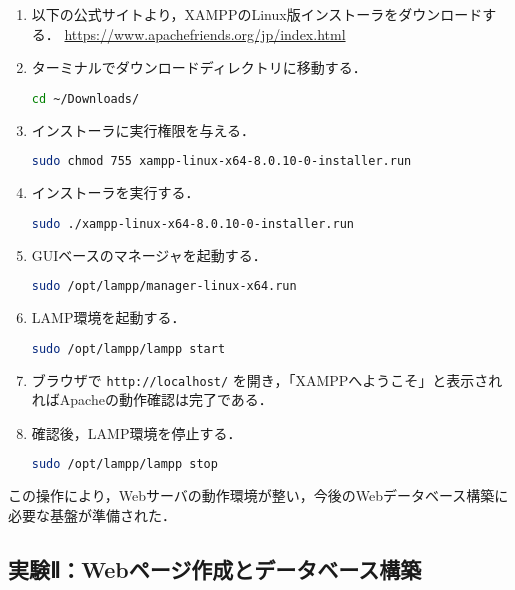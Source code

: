 \begin{enumerate}
  \item 以下の公式サイトより，XAMPPのLinux版インストーラをダウンロードする．  
        \url{https://www.apachefriends.org/jp/index.html}

  \item ターミナルでダウンロードディレクトリに移動する．
\begin{lstlisting}[language=bash]
cd ~/Downloads/
\end{lstlisting}

  \item インストーラに実行権限を与える．
\begin{lstlisting}[language=bash]
sudo chmod 755 xampp-linux-x64-8.0.10-0-installer.run
\end{lstlisting}

  \item インストーラを実行する．
\begin{lstlisting}[language=bash]
sudo ./xampp-linux-x64-8.0.10-0-installer.run
\end{lstlisting}

\item GUIベースのマネージャを起動する．
\begin{lstlisting}[language=bash]
sudo /opt/lampp/manager-linux-x64.run
\end{lstlisting}

  \item LAMP環境を起動する．
\begin{lstlisting}[language=bash]
sudo /opt/lampp/lampp start
\end{lstlisting}

  \item ブラウザで \texttt{http://localhost/} を開き，「XAMPPへようこそ」と表示されればApacheの動作確認は完了である．

  \item 確認後，LAMP環境を停止する．
\begin{lstlisting}[language=bash]
sudo /opt/lampp/lampp stop
\end{lstlisting}


\end{enumerate}

この操作により，Webサーバの動作環境が整い，今後のWebデータベース構築に必要な基盤が準備された．

\subsection*{実験Ⅱ：Webページ作成とデータベース構築}

